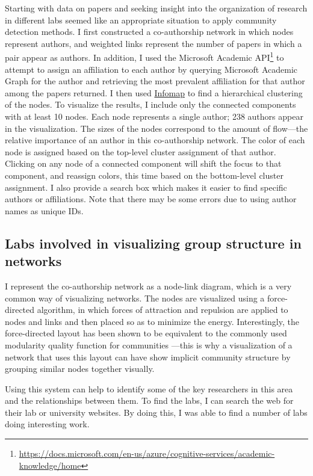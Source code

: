 Starting with data on papers and seeking insight into the organization
of research in different labs seemed like an appropriate situation to
apply community detection methods. I first constructed a co-authorship
network in which nodes represent authors, and weighted links represent
the number of papers in which a pair appear as authors. In addition, I
used the Microsoft Academic API\footnote{\url{https://docs.microsoft.com/en-us/azure/cognitive-services/academic-knowledge/home}}
to attempt to assign an affiliation to each author by querying Microsoft
Academic Graph for the author and retrieving the most prevalent
affiliation for that author among the papers returned. I then used
\protect\hyperlink{the-dynamical-perspective}{Infomap} to find a
hierarchical clustering of the nodes. To visualize the results, I
include only the connected components with at least 10 nodes. Each node
represents a single author; 238 authors appear in the visualization. The
sizes of the nodes correspond to the amount of flow---the relative
importance of an author in this co-authorship network. The color of each
node is assigned based on the top-level cluster assignment of that
author. Clicking on any node of a connected component will shift the
focus to that component, and reassign colors, this time based on the
bottom-level cluster assignment. I also provide a search box which makes
it easier to find specific authors or affiliations. Note that there may
be some errors due to using author names as unique IDs.

\subsection{Labs involved in visualizing group structure in
networks}\label{labs-involved-in-visualizing-group-structure-in-networks}

I represent the co-authorship network as a node-link diagram, which is a
very common way of visualizing networks. The nodes are visualized using
a force-directed algorithm, in which forces of attraction and repulsion
are applied to nodes and links and then placed so as to minimize the
energy. Interestingly, the force-directed layout has been shown to be
equivalent to the commonly used modularity quality function for
communities \autocite{noack_modularity_2009}---this is why a
visualization of a network that uses this layout can have show implicit
community structure by grouping similar nodes together visually.

Using this system can help to identify some of the key researchers in
this area and the relationships between them. To find the labs, I can
search the web for their lab or university websites. By doing this, I
was able to find a number of labs doing interesting work.

